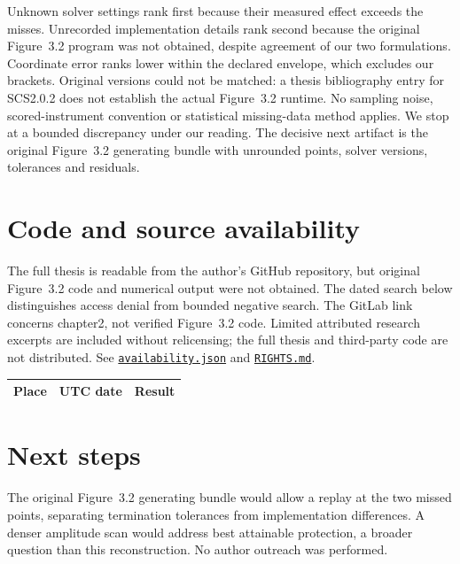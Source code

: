 \documentclass[11pt]{article}
\newcommand{\file}[2]{\href{https://github.com/alectionary/vibe-math/blob/master/formalization/denys-bosonic-pauli/#1}{\nolinkurl{#2}}}
\begin{document}
Unknown solver settings rank first because their measured effect exceeds the misses. Unrecorded implementation details rank second because the original Figure~3.2 program was not obtained, despite agreement of our two formulations. Coordinate error ranks lower within the declared envelope, which excludes our brackets. Original versions could not be matched: a thesis bibliography entry for SCS2.0.2 does not establish the actual Figure~3.2 runtime. No sampling noise, scored-instrument convention or statistical missing-data method applies. We stop at a bounded discrepancy under our reading. The decisive next artifact is the original Figure~3.2 generating bundle with unrounded points, solver versions, tolerances and residuals.

\section{Code and source availability}
The full thesis is readable from the author's GitHub repository, but original Figure~3.2 code and numerical output were not obtained. The dated search below distinguishes access denial from bounded negative search. The GitLab link concerns chapter2, not verified Figure~3.2 code. Limited attributed research excerpts are included without relicensing; the full thesis and third-party code are not distributed. See \file{provenance/availability.json}{availability.json} and \file{source-evidence/RIGHTS.md}{RIGHTS.md}.
\small\begin{longtable}{p{.23\linewidth}p{.13\linewidth}p{.56\linewidth}}\toprule Place & UTC date & Result\\\midrule\endhead
\end{longtable}\normalsize

\section{Next steps}
The original Figure~3.2 generating bundle would allow a replay at the two missed points, separating termination tolerances from implementation differences. A denser amplitude scan would address best attainable protection, a broader question than this reconstruction. No author outreach was performed.
\end{document}
